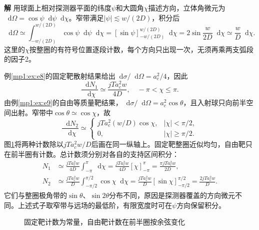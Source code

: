 \documentclass[11pt,openany,fontset=fandol]{ctexbook}
\theoremstyle{definition}\newtheorem{example}{例}[chapter]\newtheorem{exercise}{习题}[chapter]
\newcommand{\SolutionStart}{\par\medskip\ifdim\pagetotal>0pt\ifdim\dimexpr\pagegoal-\pagetotal\relax<3\baselineskip\newpage\fi\fi\noindent\textbf{解}\quad\ignorespaces}
\newenvironment{solution}{\SolutionStart}{\par\medskip}
\newcommand{\dd}{\mathop{}\!\mathrm d}\newcommand{\ee}{\mathrm e}\newcommand{\vct}[1]{\bm{#1}}
\begin{document}
\begin{solution}
用球面上相对探测器平面的纬度$\psi$和大圆角$\chi$描述方向，立体角微元为$\dd\Omega=\cos\psi\dd\psi\dd\chi$。窄带满足$|\psi|\lesssim w/(2D)$，积分后
\[
 \dd\Omega\simeq\int_{-w/(2D)}^{w/(2D)}\cos\psi\dd\psi\dd\chi
 =[\sin\psi]_{-w/(2D)}^{w/(2D)}\dd\chi
 =2\sin\frac w{2D}\dd\chi
 \simeq\frac wD\dd\chi.
\]
这里的$\chi$按整圈的有符号位置逐段计数，每个方向只出现一次，无须再乘两支弧段的因子2。

例\ref{mp1:ex:e8}的固定靶散射结果给出$\dd\sigma/\dd\Omega=a_c^2/4$，因此
\[
 \boxed{\frac{\dd N_1}{\dd\chi}\simeq\frac{jTa_c^2w}{4D},
 \quad -\pi<\chi\le\pi.}
\]
由例\ref{mp1:ex:e9}的自由等质量靶结果，$\dd\sigma/\dd\Omega=a_c^2\cos\theta$，且入射球只向前半空间出射。窄带中$\cos\theta\simeq\cos\chi$，故
\[
 \boxed{\frac{\dd N_2}{\dd\chi}\simeq
 \begin{cases}jTa_c^2(w/D)\cos\chi,&|\chi|<\pi/2,\\0,&|\chi|\ge\pi/2.\end{cases}}
\]
图\ref{mp1:fig:rev:detector-s}将两种计数除以$jTa_c^2w/D$后画在同一纵轴上。固定靶整圈近似均匀，自由靶只在前半圈有计数。总计数须分别对各自的支持区间积分：
\[
\begin{aligned}
N_1&\simeq\frac{jTa_c^2w}{4D}\int_{-\pi}^{\pi}\dd\chi
=\frac{jTa_c^2w}{4D}[\chi]_{-\pi}^{\pi}
=\frac{\pi jTa_c^2w}{2D},\\
N_2&\simeq\frac{jTa_c^2w}{D}\int_{-\pi/2}^{\pi/2}\cos\chi\dd\chi
=\frac{jTa_c^2w}{D}[\sin\chi]_{-\pi/2}^{\pi/2}
=\frac{2jTa_c^2w}{D}.
\end{aligned}
\]
它们与整圈极角带的$\sin\theta$、$\sin2\theta$分布不同，原因是探测器覆盖的方向微元不同。上述式子取窄带与远场的最低阶，有限宽度时可在$\psi$方向保留积分。

\begin{figure}[H]\centering
{}
\caption{固定靶计数为常量，自由靶计数在前半圈按余弦变化}\label{mp1:fig:rev:detector-s}
\end{figure}

\end{solution}
\end{document}
